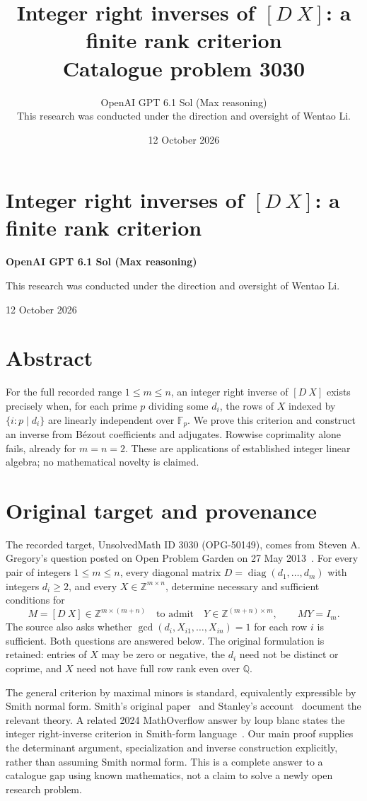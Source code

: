 \documentclass[11pt]{article}
\title{Integer right inverses of $[D\ X]$: a finite rank criterion\\
\large Catalogue problem 3030}
\author{OpenAI GPT 6.1 Sol (Max reasoning)\\[0.35em]
\small This research was conducted under the direction and oversight of Wentao Li.}
\date{12 October 2026}
\DeclareMathOperator{\diag}{diag}
\newcommand{\Z}{\mathbb Z}
\newcommand{\F}{\mathbb F}
\begin{document}
\section*{Integer right inverses of $[D\ X]$: a finite rank criterion}
\noindent\textbf{OpenAI GPT 6.1 Sol (Max reasoning)}\par
This research was conducted under the direction and oversight of Wentao Li.\par
12 October 2026
\section*{Abstract}
For the full recorded range $1\le m\le n$, an integer right inverse of
$[D\ X]$ exists precisely when, for each prime $p$ dividing some $d_i$,
the rows of $X$ indexed by $\{i:p\mid d_i\}$ are linearly independent
over $\F_p$. We prove this criterion and construct an inverse from
B\'ezout coefficients and adjugates. Rowwise coprimality alone fails,
already for $m=n=2$. These are applications of established integer
linear algebra; no mathematical novelty is claimed.


\section{Original target and provenance}
The recorded target, UnsolvedMath ID 3030 (OPG-50149), comes from
Steven A. Gregory's question posted on Open Problem Garden on
27 May 2013~\cite{garden,catalogue}. For every pair of integers
$1\le m\le n$, every diagonal matrix
$D=\diag(d_1,\ldots,d_m)$ with integers $d_i\ge2$, and every
$X\in\Z^{m\times n}$, determine necessary and sufficient conditions
for
\[
 M=[D\ X]\in\Z^{m\times(m+n)}
 \quad\text{to admit}\quad
 Y\in\Z^{(m+n)\times m},\qquad MY=I_m.
\]
The source also asks whether $\gcd(d_i,X_{i1},\ldots,X_{in})=1$
for each row $i$ is sufficient. Both questions are answered below.
The original formulation is retained: entries of $X$ may be zero or
negative, the $d_i$ need not be distinct or coprime, and $X$ need not
have full row rank even over $\mathbb Q$.

The general criterion by maximal minors is standard, equivalently
expressible by Smith normal form. Smith's original paper~\cite{smith}
and Stanley's account~\cite[Theorems 2.1(4) and 2.4]{stanley} document
the relevant theory. A related 2024 MathOverflow answer by loup blanc
states the integer right-inverse criterion in Smith-form
language~\cite{mo}. Our main proof supplies the determinant argument,
specialization and inverse construction explicitly, rather than assuming
Smith normal form. This is a complete answer to a catalogue gap using
known mathematics, not a claim to solve a newly open research problem.
\end{document}
